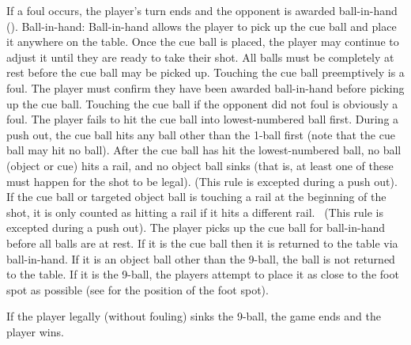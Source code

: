  If a foul occurs, the player's turn ends and the opponent is awarded ball-in-hand ().%
Ball-in-hand:
\subruleitem Ball-in-hand allows the player to pick up the cue ball and place it anywhere on the table.%
\subruleitem Once the cue ball is placed, the player may continue to adjust it until they are ready to take their shot.%
\subruleitem All balls must be completely at rest before the cue ball may be picked up. Touching the cue ball preemptively is a foul.%
\subruleitem The player must confirm they have been awarded ball-in-hand before picking up the cue ball. Touching the cue ball if the opponent did not foul is obviously a foul.%
 {}%
 \FoulCircumstances%
\subruleitem The player fails to hit the cue ball into lowest-numbered ball first.%
\subruleitem During a push out, the cue ball hits any ball other than the 1-ball first (note that the cue ball may hit no ball).
\subruleitem After the cue ball has hit the lowest-numbered ball, no ball (object or cue) hits a rail, and no object ball sinks (that is, at least one of these must happen for the shot to be legal). (This rule is excepted during a push out).%
\subsubruleitem If the cue ball or targeted object ball is touching a rail at the beginning of the shot, it is only counted as hitting a rail if it hits a different rail.%
\subruleitem \CueBallMiss\ (This rule is excepted during a push out).%
\subruleitem \CueBallSink%
\subruleitem \CueBallPreemptive%
\subruleitem The player picks up the cue ball for ball-in-hand before all balls are at rest.%
\subruleitem {}%
\subruleitem \PushShot%
\BallOffTable%
\subsubruleitem If it is the cue ball then it is returned to the table via ball-in-hand.%
\subsubruleitem If it is an object ball other than the 9-ball, the ball is not returned to the table.%
\subsubruleitem If it is the 9-ball, the players attempt to place it as close to the foot spot as possible (see  for the position of the foot spot).%
\subruleitem \JumpShot%
\subruleitem \TableMovement%
\subruleitem {}%
%


 If the player legally (without fouling) sinks the 9-ball, the game ends and the player wins.%
 {}%
 {}%
 {}%


%
 {}%
 {}%
 \Sportsmanship%
